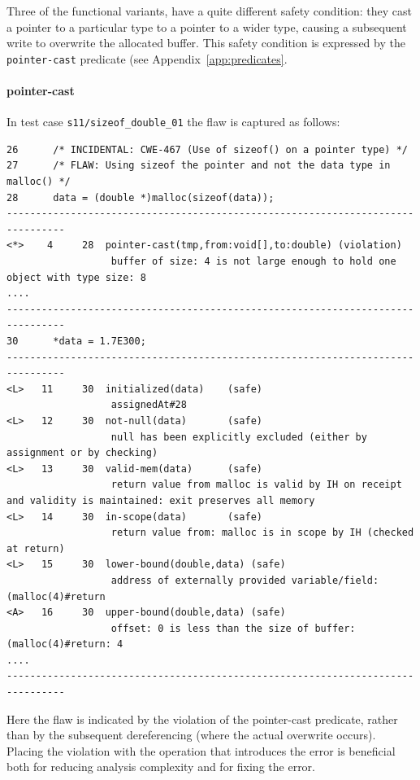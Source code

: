 \documentclass[11pt]{article}
\begin{document}
Three of the functional variants,  have a quite different safety condition:
they cast a pointer to a particular type to a pointer to a wider type, causing
a subsequent write to overwrite the allocated buffer. This safety condition is
expressed by the {\tt pointer-cast} predicate (see Appendix~\ref{app:predicates}.

\paragraph{pointer-cast}
In test case {\tt s11/sizeof\_double\_01} the flaw is captured as follows:
\begin{tiny}
\begin{verbatim}
26      /* INCIDENTAL: CWE-467 (Use of sizeof() on a pointer type) */
27      /* FLAW: Using sizeof the pointer and not the data type in malloc() */
28      data = (double *)malloc(sizeof(data));
--------------------------------------------------------------------------------
<*>    4     28  pointer-cast(tmp,from:void[],to:double) (violation)
                  buffer of size: 4 is not large enough to hold one object with type size: 8
....
--------------------------------------------------------------------------------
30      *data = 1.7E300;
--------------------------------------------------------------------------------
<L>   11     30  initialized(data)    (safe)
                  assignedAt#28
<L>   12     30  not-null(data)       (safe)
                  null has been explicitly excluded (either by assignment or by checking)
<L>   13     30  valid-mem(data)      (safe)
                  return value from malloc is valid by IH on receipt and validity is maintained: exit preserves all memory
<L>   14     30  in-scope(data)       (safe)
                  return value from: malloc is in scope by IH (checked at return)
<L>   15     30  lower-bound(double,data) (safe)
                  address of externally provided variable/field: (malloc(4)#return
<A>   16     30  upper-bound(double,data) (safe)
                  offset: 0 is less than the size of buffer: (malloc(4)#return: 4
....
--------------------------------------------------------------------------------
\end{verbatim}
\end{tiny}

Here the flaw is indicated by the violation of the pointer-cast predicate, rather
than by the subsequent  dereferencing (where the actual overwrite occurs). Placing
the violation with the operation that introduces the error is beneficial both for
reducing analysis complexity and for fixing the  error.
\end{document}

